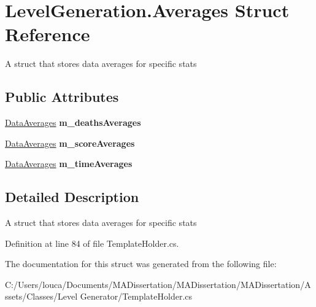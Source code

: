 \hypertarget{struct_level_generation_1_1_averages}{}\section{Level\+Generation.\+Averages Struct Reference}
\label{struct_level_generation_1_1_averages}


A struct that stores data averages for specific stats  


\subsection*{Public Attributes}
\begin{DoxyCompactItemize}
\item 
\mbox{\label{struct_level_generation_1_1_averages_a698be096130b4da9b0f5c16dae691c97}} 
\mbox{\hyperlink{struct_level_generation_1_1_data_averages}{Data\+Averages}} {\bfseries m\+\_\+deaths\+Averages}
\item 
\mbox{\label{struct_level_generation_1_1_averages_a733a863af5822b35cd8598f3c05e7bd4}} 
\mbox{\hyperlink{struct_level_generation_1_1_data_averages}{Data\+Averages}} {\bfseries m\+\_\+score\+Averages}
\item 
\mbox{\label{struct_level_generation_1_1_averages_aa2275a3e93552e7a21c22211a8f0f835}} 
\mbox{\hyperlink{struct_level_generation_1_1_data_averages}{Data\+Averages}} {\bfseries m\+\_\+time\+Averages}
\end{DoxyCompactItemize}


\subsection{Detailed Description}
A struct that stores data averages for specific stats 



Definition at line 84 of file Template\+Holder.\+cs.



The documentation for this struct was generated from the following file\+:\begin{DoxyCompactItemize}
\item 
C\+:/\+Users/louca/\+Documents/\+M\+A\+Dissertation/\+M\+A\+Dissertation/\+M\+A\+Dissertation/\+Assets/\+Classes/\+Level Generator/Template\+Holder.\+cs\end{DoxyCompactItemize}
